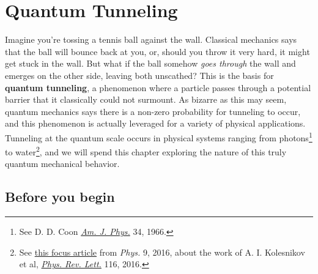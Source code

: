 

%

\chapter{Quantum Tunneling} \label{ch:tunnel}
Imagine you're tossing a tennis ball against the wall. 
Classical mechanics says that the ball will bounce back at you, or, should you throw it very hard, it might get stuck in the wall. 
But what if the ball somehow \emph{goes through} the wall and emerges on the other side, leaving both unscathed? 
This is the basis for \textbf{quantum tunneling}, a phenomenon where a particle passes through a potential barrier that it classically could not surmount. 
As bizarre as this may seem, quantum mechanics says there is a non-zero probability for tunneling to occur, and this phenomenon is actually leveraged for a variety of physical applications. 
Tunneling at the quantum scale occurs in physical systems ranging from photons\footnote{See D. D. Coon \href{http://aapt.scitation.org/doi/10.1119/1.1972893}{\emph{Am. J. Phys.}} 34, 1966.} to water\footnote{See \href{https://physics.aps.org/articles/v9/43}{this focus article} from \emph{Phys.} 9, 2016, about the work of A. I. Kolesnikov et al, \href{https://journals.aps.org/prl/abstract/10.1103/PhysRevLett.116.167802}{\emph{Phys. Rev. Lett.}} 116, 2016.}, and we will spend this chapter exploring the nature of this truly quantum mechanical behavior.


\section{Before you begin}

